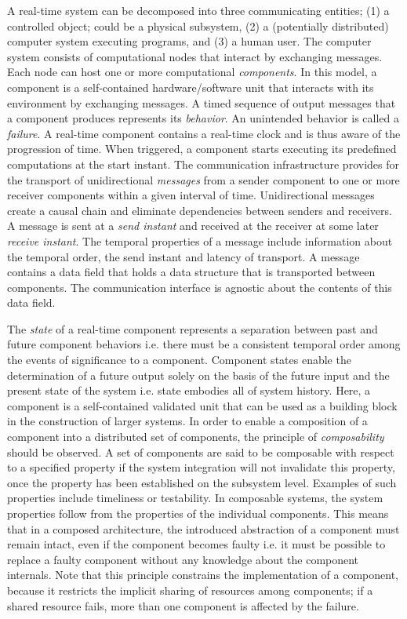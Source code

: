 A real-time system can be decomposed into three communicating entities; (1) a controlled object; could be a physical subsystem, (2) a (potentially distributed) computer system executing programs, and (3) a human user. The computer system consists of computational nodes that interact by exchanging messages. Each node can host one or more computational \emph{components}. In this model, a component is a self-contained hardware/software unit that interacts with its environment by exchanging messages. A timed sequence of output messages that a component produces represents its \emph{behavior}. An unintended behavior is called a \emph{failure}. A real-time component contains a real-time clock and is thus aware of the progression of time. When triggered, a component starts executing its predefined computations at the start instant.  The communication infrastructure provides for the transport of unidirectional \emph{messages} from a sender component to one or more receiver components within a given interval of time. Unidirectional messages create a causal chain and eliminate dependencies between senders and receivers. A message is sent at a \emph{send instant} and received at the receiver at some later \emph{receive instant}. The temporal properties of a message include information about the temporal order, the send instant and latency of transport. A message contains a data field that holds a data structure that is transported between components. The communication interface is agnostic about the contents of this data field. 

The \emph{state} of a real-time component represents a separation between past and future component behaviors i.e. there must be a consistent temporal order among the events of significance to a component. Component states enable the determination of a future output solely on the basis of the future input and the present state of the system i.e. state embodies all of system history. Here, a component is a self-contained validated unit that can be used as a building block in the construction of larger systems. In order to enable a composition of a component into a distributed set of components, the principle of \emph{composability} should be observed. A set of components are said to be composable with respect to a specified property if the system integration will not invalidate this property, once the property has been established on the subsystem level. Examples of such properties include timeliness or testability. In composable systems, the system properties follow from the properties of the individual components. This means that in a composed architecture, the introduced abstraction of a component must remain intact, even if the component becomes faulty i.e. it must be possible to replace a faulty component without any knowledge about the component internals. Note that this principle constrains the implementation of a component, because it restricts the implicit sharing of resources among components; if a shared resource fails, more than one component is affected by the failure. 

